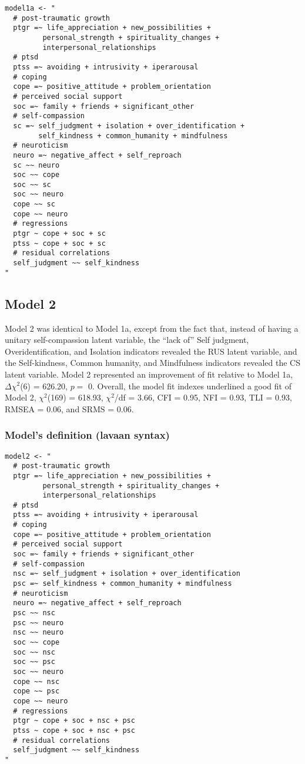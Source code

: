 \begin{appendix}
\begin{verbatim}
model1a <- "
  # post-traumatic growth
  ptgr =~ life_appreciation + new_possibilities + 
         personal_strength + spirituality_changes + 
         interpersonal_relationships
  # ptsd
  ptss =~ avoiding + intrusivity + iperarousal
  # coping
  cope =~ positive_attitude + problem_orientation 
  # perceived social support
  soc =~ family + friends + significant_other
  # self-compassion
  sc =~ self_judgment + isolation + over_identification +
        self_kindness + common_humanity + mindfulness
  # neuroticism
  neuro =~ negative_affect + self_reproach
  sc ~~ neuro
  soc ~~ cope
  soc ~~ sc
  soc ~~ neuro
  cope ~~ sc
  cope ~~ neuro
  # regressions
  ptgr ~ cope + soc + sc 
  ptss ~ cope + soc + sc 
  # residual correlations
  self_judgment ~~ self_kindness
"
\end{verbatim}

\newpage

\hypertarget{model-2}{%
\subsection{Model 2}\label{model-2}}

Model 2 was identical to Model 1a, except from the fact that, instead of
having a unitary self-compassion latent variable, the ``lack of'' Self
judgment, Overidentification, and Isolation indicators revealed the RUS
latent variable, and the Self-kindness, Common humanity, and Mindfulness
indicators revealed the CS latent variable. Model 2 represented an
improvement of fit relative to Model 1a, \(\Delta \chi^2\)(6) = 626.20,
\(p =\) 0. Overall, the model fit indexes underlined a good fit of Model
2, \(\chi^2\)(169) = 618.93, \(\chi^2\)/df = 3.66, CFI = 0.95, NFI =
0.93, TLI = 0.93, RMSEA = 0.06, and SRMS = 0.06.

\hypertarget{models-definition-lavaan-syntax-3}{%
\subsubsection{Model's definition (lavaan
syntax)}\label{models-definition-lavaan-syntax-3}}

\begin{verbatim}
model2 <- "
  # post-traumatic growth
  ptgr =~ life_appreciation + new_possibilities + 
         personal_strength + spirituality_changes + 
         interpersonal_relationships
  # ptsd
  ptss =~ avoiding + intrusivity + iperarousal
  # coping
  cope =~ positive_attitude + problem_orientation 
  # perceived social support
  soc =~ family + friends + significant_other
  # self-compassion
  nsc =~ self_judgment + isolation + over_identification
  psc =~ self_kindness + common_humanity + mindfulness
  # neuroticism
  neuro =~ negative_affect + self_reproach
  psc ~~ nsc
  psc ~~ neuro
  nsc ~~ neuro
  soc ~~ cope
  soc ~~ nsc
  soc ~~ psc
  soc ~~ neuro
  cope ~~ nsc
  cope ~~ psc
  cope ~~ neuro
  # regressions
  ptgr ~ cope + soc + nsc + psc 
  ptss ~ cope + soc + nsc + psc 
  # residual correlations
  self_judgment ~~ self_kindness
"
\end{verbatim}


\end{appendix}
